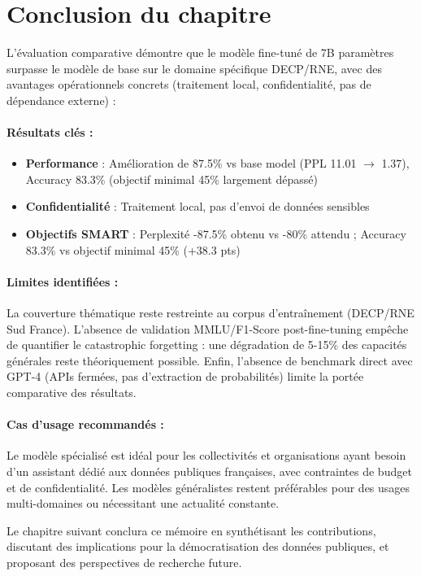 \section{Conclusion du chapitre}

L'évaluation comparative démontre que le modèle fine-tuné de 7B paramètres surpasse le modèle de base sur le domaine spécifique DECP/RNE, avec des avantages opérationnels concrets (traitement local, confidentialité, pas de dépendance externe) :

\paragraph{Résultats clés :}
\begin{itemize}
    \item \textbf{Performance} : Amélioration de 87.5\% vs base model (PPL 11.01 $\rightarrow$ 1.37), Accuracy 83.3\% (objectif minimal 45\% largement dépassé)
    \item \textbf{Confidentialité} : Traitement local, pas d'envoi de données sensibles
    \item \textbf{Objectifs SMART} : Perplexité -87.5\% obtenu vs -80\% attendu ; Accuracy 83.3\% vs objectif minimal 45\% (+38.3 pts)
\end{itemize}

\paragraph{Limites identifiées :}
La couverture thématique reste restreinte au corpus d'entraînement (DECP/RNE Sud France). L'absence de validation MMLU/F1-Score post-fine-tuning empêche de quantifier le catastrophic forgetting : une dégradation de 5-15\% des capacités générales reste théoriquement possible. Enfin, l'absence de benchmark direct avec GPT-4 (APIs fermées, pas d'extraction de probabilités) limite la portée comparative des résultats.

\paragraph{Cas d'usage recommandés :}
Le modèle spécialisé est idéal pour les collectivités et organisations ayant besoin d'un assistant dédié aux données publiques françaises, avec contraintes de budget et de confidentialité. Les modèles généralistes restent préférables pour des usages multi-domaines ou nécessitant une actualité constante.

Le chapitre suivant conclura ce mémoire en synthétisant les contributions, discutant des implications pour la démocratisation des données publiques, et proposant des perspectives de recherche future.
